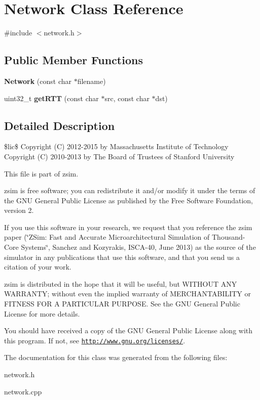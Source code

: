 \hypertarget{classNetwork}{\section{Network Class Reference}
\label{classNetwork}
}


{\ttfamily \#include $<$network.\-h$>$}

\subsection*{Public Member Functions}
\begin{DoxyCompactItemize}
\item 
\hypertarget{classNetwork_abe92fd675aabf57c14612fa7eed101cc}{{\bfseries Network} (const char $\ast$filename)}\label{classNetwork_abe92fd675aabf57c14612fa7eed101cc}

\item 
\hypertarget{classNetwork_ac23b99975b48e83f048c01f5ca90f763}{uint32\-\_\-t {\bfseries get\-R\-T\-T} (const char $\ast$src, const char $\ast$dst)}\label{classNetwork_ac23b99975b48e83f048c01f5ca90f763}

\end{DoxyCompactItemize}


\subsection{Detailed Description}
\$lic\$ Copyright (C) 2012-\/2015 by Massachusetts Institute of Technology Copyright (C) 2010-\/2013 by The Board of Trustees of Stanford University

This file is part of zsim.

zsim is free software; you can redistribute it and/or modify it under the terms of the G\-N\-U General Public License as published by the Free Software Foundation, version 2.

If you use this software in your research, we request that you reference the zsim paper (\char`\"{}\-Z\-Sim\-: Fast and Accurate Microarchitectural Simulation of
\-Thousand-\/\-Core Systems\char`\"{}, Sanchez and Kozyrakis, I\-S\-C\-A-\/40, June 2013) as the source of the simulator in any publications that use this software, and that you send us a citation of your work.

zsim is distributed in the hope that it will be useful, but W\-I\-T\-H\-O\-U\-T A\-N\-Y W\-A\-R\-R\-A\-N\-T\-Y; without even the implied warranty of M\-E\-R\-C\-H\-A\-N\-T\-A\-B\-I\-L\-I\-T\-Y or F\-I\-T\-N\-E\-S\-S F\-O\-R A P\-A\-R\-T\-I\-C\-U\-L\-A\-R P\-U\-R\-P\-O\-S\-E. See the G\-N\-U General Public License for more details.

You should have received a copy of the G\-N\-U General Public License along with this program. If not, see \href{http://www.gnu.org/licenses/}{\tt http\-://www.\-gnu.\-org/licenses/}. 

The documentation for this class was generated from the following files\-:\begin{DoxyCompactItemize}
\item 
network.\-h\item 
network.\-cpp\end{DoxyCompactItemize}
